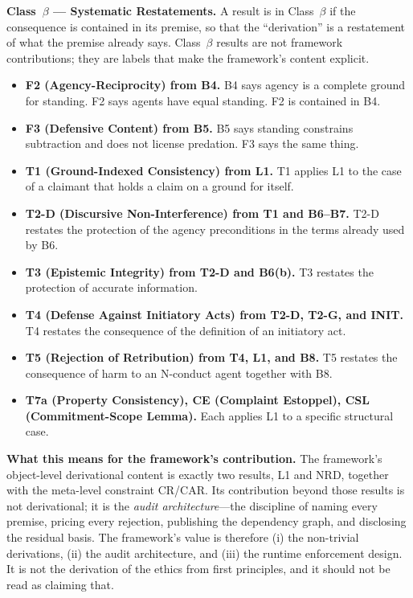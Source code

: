 \documentclass[11pt]{article}
\newcommand{\cb}{\texorpdfstring{Class~$\beta$}{Class beta}}
\begin{document}
\begin{paperbox}
\textbf{\cb{} --- Systematic Restatements.} A result is in \cb{} if the consequence is contained in its premise, so that the ``derivation'' is a restatement of what the premise already says. \cb{} results are not framework contributions; they are labels that make the framework's content explicit.
\begin{itemize}
\item \textbf{F2 (Agency-Reciprocity) from B4.} B4 says agency is a complete ground for standing. F2 says agents have equal standing. F2 is contained in B4.
\item \textbf{F3 (Defensive Content) from B5.} B5 says standing constrains subtraction and does not license predation. F3 says the same thing.
\item \textbf{T1 (Ground-Indexed Consistency) from L1.} T1 applies L1 to the case of a claimant that holds a claim on a ground for itself.
\item \textbf{T2-D (Discursive Non-Interference) from T1 and B6--B7.} T2-D restates the protection of the agency preconditions in the terms already used by B6.
\item \textbf{T3 (Epistemic Integrity) from T2-D and B6(b).} T3 restates the protection of accurate information.
\item \textbf{T4 (Defense Against Initiatory Acts) from T2-D, T2-G, and INIT.} T4 restates the consequence of the definition of an initiatory act.
\item \textbf{T5 (Rejection of Retribution) from T4, L1, and B8.} T5 restates the consequence of harm to an N-conduct agent together with B8.
\item \textbf{T7a (Property Consistency), CE (Complaint Estoppel), CSL (Commitment-Scope Lemma).} Each applies L1 to a specific structural case.
\end{itemize}
\end{paperbox}

\textbf{What this means for the framework's contribution.} The framework's object-level derivational content is exactly two results, L1 and NRD, together with the meta-level constraint CR/CAR. Its contribution beyond those results is not derivational; it is the \emph{audit architecture}---the discipline of naming every premise, pricing every rejection, publishing the dependency graph, and disclosing the residual basis. The framework's value is therefore (i) the non-trivial derivations, (ii) the audit architecture, and (iii) the runtime enforcement design. It is not the derivation of the ethics from first principles, and it should not be read as claiming that.
\end{document}
